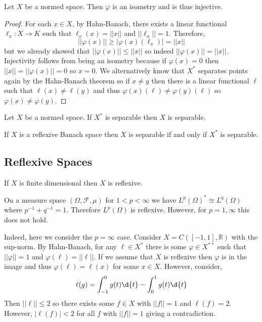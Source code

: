 \documentclass[12pt]{article}
\newcommand{\R}{\mathbb{R}}
\renewcommand{\F}{\mathcal{F}}
\begin{document}
\begin{prop}
Let $X$ be a normed space. Then $\varphi$ is an isometry and is thus injective.
\end{prop}

\begin{proof}
For each $x \in X$, by Hahn-Banach, there exists a linear functional $\ell_x : X \to K$ such that $\ell_x(x) = || x ||$ and $|| \ell_x || = 1$. Therefore,
\[ || \varphi(x) || \ge | \varphi(x)(\ell_x) | = || x || \]
but we already showed that $|| \varphi(x) || \le || x ||$ so indeed $|| \varphi(x) || = || x ||$. Injectivity follows from being an isometry because if $\varphi(x) = 0$ then $|| x || = || \varphi(x) || = 0$ so $x = 0$. We alternatively know that $X^*$ separates points again by the Hahn-Banach theorem so if $x \neq y$ then there is a linear functional $\ell$ such that $\ell(x) \neq \ell(y)$ and thus $\varphi(x)(\ell) \neq \varphi(y)(\ell)$ so $\varphi(x) \neq \varphi(y)$.
\end{proof}

\begin{thm}
Let $X$ be a normed space. If $X^*$ is separable then $X$ is separable.
\end{thm}

\begin{cor}
If $X$ is a reflexive Banach space then $X$ is separable if and only if $X^*$ is separable.
\end{cor}


\subsection{Reflexive Spaces}

\begin{example}
If $X$ is finite dimensional then $X$ is reflexive.
\end{example}

\begin{example}
On a measure space $(\Omega, \F, \mu)$ for $1 < p < \infty$ we have $L^p(\Omega)^* \cong L^q(\Omega)$ where $p^{-1} + q^{-1} = 1$. Therefore $L^p(\Omega)$ is reflexive. However, for $p = 1, \infty$ this does not hold.
\end{example}

\begin{example}
Indeed, here we consider the $p = \infty$ case. Consider $X = C([-1,1], \R)$ with the sup-norm. By Hahn-Banach, for any $\ell \in X^*$ there is some $\varphi \in X^{**}$ such that $||\varphi || = 1$ and $\varphi(\ell) = || \ell ||$. If we assume that $X$ is reflexive then $\varphi$ is in the image and thus $\varphi(\ell) = \ell(x)$ for some $x \in X$. However, consider,
\[ \ell(g) = \int_{-1}^0 g(t) \d{t} - \int_0^1 g(t) \d{t} \]
Then $|| \ell || \le 2$ so there exists some $f \in X$ with $|| f || = 1$ and $\ell(f) = 2$. However, $| \ell(f) | < 2$ for all $f$ with $|| f || = 1$ giving a contradiction.
\end{example}
\end{document}
